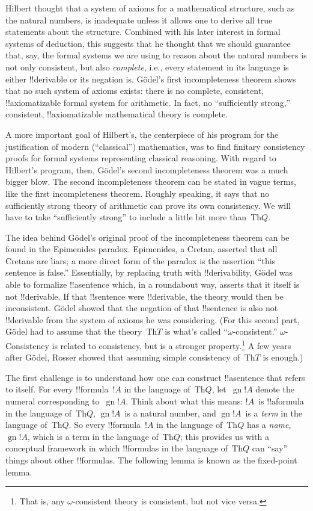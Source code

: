 \documentclass[10pt,a4paper]{article}
\theoremstyle{plain}
\theoremstyle{definition}
\theoremstyle{remark}
\providecommand{\Th}{\ensuremath{\mathrm{Th}}}
\providecommand{\Gn}{\operatorname{gn}}
\providecommand{\gn}{\operatorname{gn}}
\begin{document}
Hilbert thought that a system of axioms for a mathematical structure,
such as the natural numbers, is inadequate unless it allows one to
derive all true statements about the structure. Combined with his
later interest in formal systems of deduction, this suggests that he
thought that we should guarantee that, say, the formal systems we are
using to reason about the natural numbers is not only consistent, but
also \emph{complete}, i.e., every statement in its language is either
!!{derivable} or its negation is. G\"odel's first incompleteness theorem
shows that no such system of axioms exists: there is no complete,
consistent, !!{axiomatizable} formal system for arithmetic.  In fact,
no ``sufficiently strong,'' consistent, !!{axiomatizable} mathematical
theory is complete.

A more important goal of Hilbert's, the centerpiece of his program for
the justification of modern (``classical'') mathematics, was to find
finitary consistency proofs for formal systems representing classical
reasoning.  With regard to Hilbert's program, then, G\"odel's second
incompleteness theorem was a much bigger blow. The second
incompleteness theorem can be stated in vague terms, like the first
incompleteness theorem. Roughly speaking, it says that no sufficiently
strong theory of arithmetic can prove its own consistency. We will
have to take ``sufficiently strong'' to include a little bit more
than~$\Th{Q}$.

The idea behind G\"odel's original proof of the incompleteness theorem
can be found in the Epimenides paradox. Epimenides, a Cretan, asserted
that all Cretans are liars; a more direct form of the paradox is the
assertion ``this sentence is false.'' Essentially, by replacing truth
with !!{derivability}, G\"odel was able to formalize !!a{sentence}
which, in a roundabout way, asserts that it itself is not
!!{derivable}.  If that !!{sentence} were !!{derivable}, the theory
would then be inconsistent.  G\"odel showed that the negation of that
!!{sentence} is also not !!{derivable} from the system of axioms he was
considering. (For this second part, G\"odel had to assume that the
theory~$\Th{T}$ is what's called ``$\omega$-consistent.''
$\omega$-Consistency is related to consistency, but is a stronger
property.\footnote{That is, any $\omega$-consistent theory is
consistent, but not vice versa.} A few years after G\"odel, Rosser
showed that assuming simple consistency of~$\Th{T}$ is enough.)

The first challenge is to understand how one can construct !!a{sentence}
that refers to itself. For every !!{formula}~$!A$ in the language
of~$\Th{Q}$, let~$\gn{!A}$ denote the numeral corresponding
to~$\Gn{!A}$. Think about what this means: $!A$~is !!a{formula} in the
language of~$\Th{Q}$, $\Gn{!A}$~is a natural number, and $\gn{!A}$~is
a \emph{term} in the language of~$\Th{Q}$. So every !!{formula}~$!A$
in the language of~$\Th{Q}$ has a \emph{name},~$\gn{!A}$, which is a
term in the language of~$\Th{Q}$; this provides us with a conceptual
framework in which !!{formula}s in the language of~$\Th{Q}$ can ``say''
things about other !!{formula}s. The following lemma is known as the
fixed-point lemma.
\end{document}
